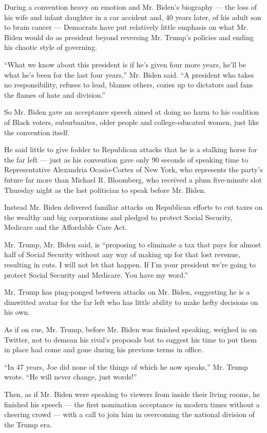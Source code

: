During a convention heavy on emotion and Mr. Biden's biography --- the
loss of his wife and infant daughter in a car accident and, 40 years
later, of his adult son to brain cancer --- Democrats have put
relatively little emphasis on what Mr. Biden would do as president
beyond reversing Mr. Trump's policies and ending his chaotic style of
governing.

``What we know about this president is if he's given four more years,
he'll be what he's been for the last four years,'' Mr. Biden said. ``A
president who takes no responsibility, refuses to lead, blames others,
cozies up to dictators and fans the flames of hate and division.''

So Mr. Biden gave an acceptance speech aimed at doing no harm to his
coalition of Black voters, suburbanites, older people and
college-educated women, just like the convention itself.

He said little to give fodder to Republican attacks that he is a
stalking horse for the far left --- just as his convention gave only 90
seconds of speaking time to Representative Alexandria Ocasio-Cortez of
New York, who represents the party's future far more than Michael R.
Bloomberg, who received a plum five-minute slot Thursday night as the
last politician to speak before Mr. Biden.

Instead Mr. Biden delivered familiar attacks on Republican efforts to
cut taxes on the wealthy and big corporations and pledged to protect
Social Security, Medicare and the Affordable Care Act.

Mr. Trump, Mr. Biden said, is ``proposing to eliminate a tax that pays
for almost half of Social Security without any way of making up for that
lost revenue, resulting in cuts. I will not let that happen. If I'm your
president we're going to protect Social Security and Medicare. You have
my word.''

Mr. Trump has ping-ponged between attacks on Mr. Biden, suggesting he is
a dimwitted avatar for the far left who has little ability to make hefty
decisions on his own.

As if on cue, Mr. Trump, before Mr. Biden was finished speaking, weighed
in on Twitter, not to demean his rival's proposals but to suggest his
time to put them in place had come and gone during his previous terms in
office.

``In 47 years, Joe did none of the things of which he now speaks,'' Mr.
Trump wrote. ``He will never change, just words!''

Then, as if Mr. Biden were speaking to viewers from inside their living
rooms, he finished his speech --- the first nomination acceptance in
modern times without a cheering crowd --- with a call to join him in
overcoming the national division of the Trump era.

